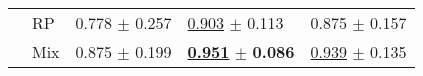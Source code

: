 \begin{tabular}{lllll}
 & RP & \textcolor[rgb]{0.2790211877,0.5000000000,0}{0.778} $\pm$ \textcolor[rgb]{0.9977538235,0.0022461765,0}{0.257} & \underline{\textcolor[rgb]{0.2932263815,0.5000000000,0}{0.903}} $\pm$ \textcolor[rgb]{0.3666523082,0.5000000000,0}{0.113} & \textcolor[rgb]{0.2500000000,0.5000000000,0}{0.875} $\pm$ \textcolor[rgb]{0.1960820797,0.5000000000,0}{0.157} \\
 & Mix & \textcolor[rgb]{0.0492390331,0.5000000000,0}{0.875} $\pm$ \textcolor[rgb]{0.6812870810,0.3187129190,0}{0.199} & \underline{\textbf{\textcolor[rgb]{0.0000000000,0.5000000000,0}{0.951}}} $\pm$ \textbf{\textcolor[rgb]{0.0000000000,0.5000000000,0}{0.086}} & \underline{\textcolor[rgb]{0.0181818182,0.5000000000,0}{0.939}} $\pm$ \textcolor[rgb]{0.0367461744,0.5000000000,0}{0.135} \\
\bottomrule
\end{tabular}

